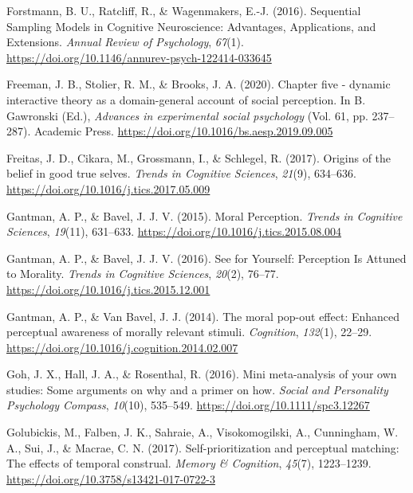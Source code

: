 \documentclass[
  man]{apa6}
\newlength{\cslhangindent}
\newlength{\cslentryspacingunit} %
\newenvironment{CSLReferences}[2] %
 {%
  \setlength{\parindent}{0pt}
  \ifodd #1
  \let\oldpar\par
  \def\par{\hangindent=\cslhangindent\oldpar}
  \fi
  \setlength{\parskip}{#2\cslentryspacingunit}
 }%
 {}
\begin{document}
\begin{CSLReferences}{1}{0}
\leavevmode{}%
Forstmann, B. U., Ratcliff, R., \& Wagenmakers, E.-J. (2016). Sequential {Sampling} {Models} in {Cognitive} {Neuroscience}: {Advantages}, {Applications}, and {Extensions}. \emph{Annual Review of Psychology}, \emph{67}(1). \url{https://doi.org/10.1146/annurev-psych-122414-033645}

\leavevmode{}%
Freeman, J. B., Stolier, R. M., \& Brooks, J. A. (2020). Chapter five - dynamic interactive theory as a domain-general account of social perception. In B. Gawronski (Ed.), \emph{Advances in experimental social psychology} (Vol. 61, pp. 237--287). Academic Press. \url{https://doi.org/10.1016/bs.aesp.2019.09.005}

\leavevmode{}%
Freitas, J. D., Cikara, M., Grossmann, I., \& Schlegel, R. (2017). Origins of the belief in good true selves. \emph{Trends in Cognitive Sciences}, \emph{21}(9), 634--636. \url{https://doi.org/10.1016/j.tics.2017.05.009}

\leavevmode{}%
Gantman, A. P., \& Bavel, J. J. V. (2015). Moral {Perception}. \emph{Trends in Cognitive Sciences}, \emph{19}(11), 631--633. \url{https://doi.org/10.1016/j.tics.2015.08.004}

\leavevmode{}%
Gantman, A. P., \& Bavel, J. J. V. (2016). See for {Yourself}: {Perception} {Is} {Attuned} to {Morality}. \emph{Trends in Cognitive Sciences}, \emph{20}(2), 76--77. \url{https://doi.org/10.1016/j.tics.2015.12.001}

\leavevmode{}%
Gantman, A. P., \& Van Bavel, J. J. (2014). The moral pop-out effect: Enhanced perceptual awareness of morally relevant stimuli. \emph{Cognition}, \emph{132}(1), 22--29. \url{https://doi.org/10.1016/j.cognition.2014.02.007}

\leavevmode{}%
Goh, J. X., Hall, J. A., \& Rosenthal, R. (2016). Mini meta-analysis of your own studies: Some arguments on why and a primer on how. \emph{Social and Personality Psychology Compass}, \emph{10}(10), 535--549. \url{https://doi.org/10.1111/spc3.12267}

\leavevmode{}%
Golubickis, M., Falben, J. K., Sahraie, A., Visokomogilski, A., Cunningham, W. A., Sui, J., \& Macrae, C. N. (2017). Self-prioritization and perceptual matching: The effects of temporal construal. \emph{Memory \& Cognition}, \emph{45}(7), 1223--1239. \url{https://doi.org/10.3758/s13421-017-0722-3}


\end{CSLReferences}
\end{document}
